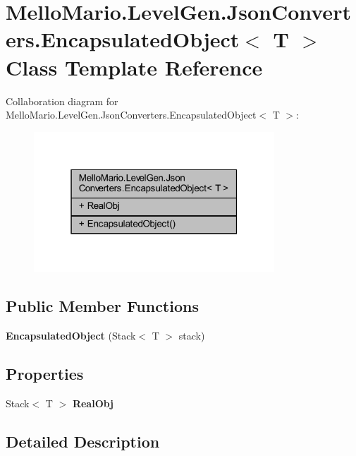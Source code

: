 \section{Mello\+Mario.\+Level\+Gen.\+Json\+Converters.\+Encapsulated\+Object$<$ T $>$ Class Template Reference}
\label{classMelloMario_1_1LevelGen_1_1JsonConverters_1_1EncapsulatedObject}


Collaboration diagram for Mello\+Mario.\+Level\+Gen.\+Json\+Converters.\+Encapsulated\+Object$<$ T $>$\+:
\nopagebreak
\begin{figure}[H]
\begin{center}
\leavevmode
\includegraphics[width=256pt]{classMelloMario_1_1LevelGen_1_1JsonConverters_1_1EncapsulatedObject__coll__graph}
\end{center}
\end{figure}
\subsection*{Public Member Functions}
\begin{DoxyCompactItemize}
\item 
\textbf{ Encapsulated\+Object} (Stack$<$ T $>$ stack)
\end{DoxyCompactItemize}
\subsection*{Properties}
\begin{DoxyCompactItemize}
\item 
Stack$<$ T $>$ \textbf{ Real\+Obj}\hspace{0.3cm}{\ttfamily  [get]}
\end{DoxyCompactItemize}


\subsection{Detailed Description}


